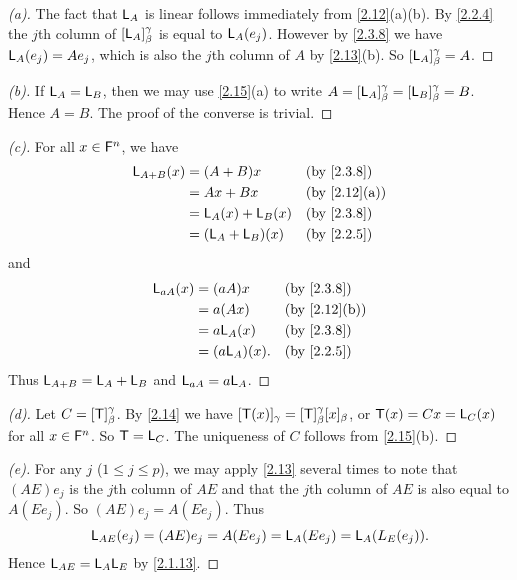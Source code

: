 \begin{proof}[(a)]
	The fact that \(\mathsf{L}_A\) is linear follows immediately from \cref{2.12}(a)(b).
	By \cref{2.2.4} the \(j\)th column of \([\mathsf{L}_A]_{\beta}^{\gamma}\) is equal to \(\mathsf{L}_A(e_j)\).
	However by \cref{2.3.8} we have \(\mathsf{L}_A(e_j) = A e_j\), which is also the \(j\)th column of \(A\) by \cref{2.13}(b).
	So \([\mathsf{L}_A]_{\beta}^{\gamma} = A\).
\end{proof}

\begin{proof}[(b)]
	If \(\mathsf{L}_A = \mathsf{L}_B\), then we may use \cref{2.15}(a) to write \(A = [\mathsf{L}_A]_{\beta}^{\gamma} = [\mathsf{L}_B]_{\beta}^{\gamma} = B\).
	Hence \(A = B\).
	The proof of the converse is trivial.
\end{proof}

\begin{proof}[(c)]
	For all \(x \in \mathsf{F}^n\), we have
	\begin{align*}
		\L_{A + B}(x) & = (A + B) x         &  & \by{2.3.8}   \\
		              & = Ax + Bx           &  & \by{2.12}[a] \\
		              & = \L_A(x) + \L_B(x) &  & \by{2.3.8}   \\
		              & = (\L_A + \L_B)(x)  &  & \by{2.2.5}
	\end{align*}
	and
	\begin{align*}
		\L_{aA}(x) & = (aA) x       &  & \by{2.3.8}   \\
		           & = a (Ax)       &  & \by{2.12}[b] \\
		           & = a \L_A(x)    &  & \by{2.3.8}   \\
		           & = (a \L_A)(x). &  & \by{2.2.5}
	\end{align*}
	Thus \(\mathsf{L}_{A + B} = \mathsf{L}_A + \mathsf{L}_B\) and \(\mathsf{L}_{aA} = a \mathsf{L}_A\).
\end{proof}

\begin{proof}[(d)]
	Let \(C = [\mathsf{T}]_{\beta}^{\gamma}\).
	By \cref{2.14} we have \([\mathsf{T}(x)]_{\gamma} = [\mathsf{T}]_{\beta}^{\gamma} [x]_{\beta}\), or \(\mathsf{T}(x) = Cx = \mathsf{L}_C(x)\) for all \(x \in \mathsf{F}^n\).
	So \(\mathsf{T} = \mathsf{L}_C\).
	The uniqueness of \(C\) follows from \cref{2.15}(b).
\end{proof}

\begin{proof}[(e)]
	For any \(j\) (\(1 \leq j \leq p\)), we may apply \cref{2.13} several times to note that \((AE) e_j\) is the \(j\)th column of \(AE\) and that the \(j\)th column of \(AE\) is also equal to \(A (E e_j)\).
	So \((AE) e_j = A (Ee_j)\).
	Thus
	\[
		\mathsf{L}_{AE}(e_j) = (AE) e_j = A (E e_j) = \mathsf{L}_A(E e_j) = \mathsf{L}_A(L_E(e_j)).
	\]
	Hence \(\mathsf{L}_{AE} = \mathsf{L}_A \mathsf{L}_E\) by \cref{2.1.13}.
\end{proof}

